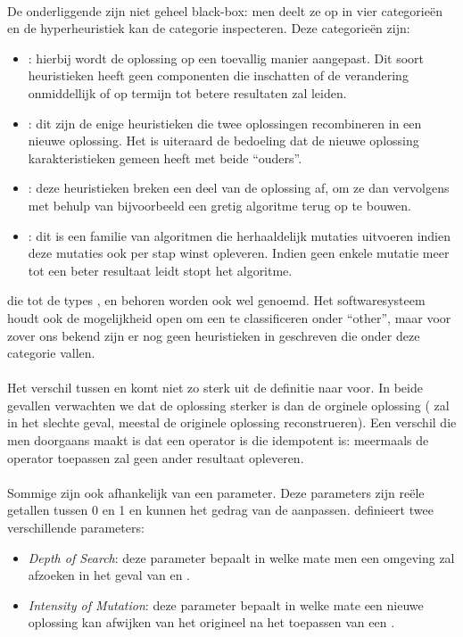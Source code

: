 \paragraph{}
De onderliggende \abllhn{} zijn niet geheel black-box: men deelt ze op in vier categorie\"en en de hyperheuristiek kan de categorie inspecteren. Deze categorie\"en zijn:
\begin{itemize}
 \item \emph{\abmt{}}: hierbij wordt de oplossing op een toevallig manier aangepast. Dit soort heuristieken heeft geen componenten die inschatten of de verandering onmiddellijk of op termijn tot betere resultaten zal leiden.
 \item \emph{\abco{}}: dit zijn de enige heuristieken die twee oplossingen recombineren in een nieuwe oplossing. Het is uiteraard de bedoeling dat de nieuwe oplossing karakteristieken gemeen heeft met beide ``ouders''.
 \item \emph{\abrr{}}: deze heuristieken breken een deel van de oplossing af, om ze dan vervolgens met behulp van bijvoorbeeld een gretig algoritme terug op te bouwen.
 \item \emph{\abls{}}: dit is een familie van algoritmen die herhaaldelijk mutaties uitvoeren indien deze mutaties ook per stap winst opleveren. Indien geen enkele mutatie meer tot een beter resultaat leidt stopt het algoritme.
\end{itemize}
\abllhn[L]{} die tot de types \abmt{}, \abco{} en \abrr{} behoren worden ook wel \abpts{} genoemd. Het softwaresysteem houdt ook de mogelijkheid open om een \abllh{} te classificeren onder ``other'', maar voor zover ons bekend zijn er nog geen heuristieken in \abhf{} geschreven die onder deze categorie vallen.

\paragraph{}
Het verschil tussen \abrr{} en \abls{} komt niet zo sterk uit de definitie naar voor. In beide gevallen verwachten we dat de oplossing sterker is dan de orginele oplossing (\abrr{} zal in het slechte geval, meestal de originele oplossing reconstrueren). Een verschil die men doorgaans maakt is dat \abls{} een operator is die idempotent is: meermaals de operator toepassen zal geen ander resultaat opleveren.

\paragraph{}
Sommige \abllhn{} zijn ook afhankelijk van een parameter. Deze parameters zijn re\"ele getallen tussen 0 en 1 en kunnen het gedrag van de \abllh{} aanpassen. \abhf{} definieert twee verschillende parameters:
\begin{itemize}
 \item \emph{Depth of Search}: deze parameter bepaalt in welke mate men een omgeving zal afzoeken in het geval van \abrr{} en \abls{}.
 \item \emph{Intensity of Mutation}: deze parameter bepaalt in welke mate een nieuwe oplossing kan afwijken van het origineel na het toepassen van een \abmt{}.
\end{itemize}


